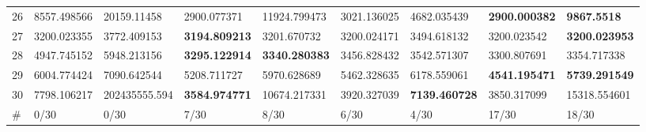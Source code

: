 \begin{table*}[t]
\begin{tabular}{|p{0.8cm}|p{1.6cm}|p{1.6cm}|p{1.6cm}|p{1.6cm}|p{1.6cm}|p{1.6cm}|p{1.6cm}|p{1.6cm}|}
26  & 8557.498566 & 20159.11458 & 2900.077371 & 11924.799473 & 3021.136025 & 4682.035439 & \textbf{2900.000382} & \textbf{9867.5518} \\ 
27  & 3200.023355 & 3772.409153 & \textbf{3194.809213} & 3201.670732 & 3200.024171 & 3494.618132 & 3200.023542 & \textbf{3200.023953} \\ 
28  & 4947.745152 & 5948.213156 & \textbf{3295.122914} & \textbf{3340.280383} & 3456.828432 & 3542.571307 & 3300.807691 & 3354.717338 \\ 
29  & 6004.774424 & 7090.642544 & 5208.711727 & 5970.628689 & 5462.328635 & 6178.559061 & \textbf{4541.195471} & \textbf{5739.291549} \\ 
30  & 7798.106217 & 202435555.594 & \textbf{3584.974771} & 10674.217331 & 3920.327039 & \textbf{7139.460728} & 3850.317099 & 15318.554601 \\ 
\hline
\#  & 0/30 & 0/30 & 7/30 & 8/30 & 6/30 & 4/30 & 17/30 & 18/30 \\
\hline

 \end{tabular}
\end{table*}
\endgroup
